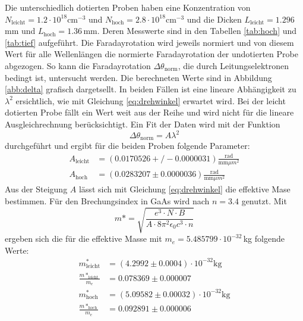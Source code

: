 Die unterschiedlich dotierten Proben haben eine Konzentration von $N_{\text{leicht}}=1.2\cdot10^{18}\text{cm}^{-3}$ und $N_{\text{hoch}}=2.8\cdot10^{18}\text{cm}^{-3}$ und die Dicken $L_{\text{leicht}}=1.296\,$mm und $L_{\text{hoch}}=1.36\,$mm.
Deren Messwerte sind in den Tabellen \ref{tab:hoch} und \ref{tab:tief} aufgeführt.
Die Faradayrotation wird jeweils normiert und von diesem Wert für alle Wellenlängen die normierte Faradayrotation der undotierten Probe abgezogen.
So kann die Faradayrotation $\Delta\theta_\text{norm}$, die durch Leitungselektronen bedingt ist, untersucht werden. 
Die berechneten Werte sind in Abbildung \ref{abb:delta} grafisch dargetsellt.
In beiden Fällen ist eine lineare Abhängigkeit zu $\lambda^2$ ersichtlich, wie mit Gleichung \ref{eq:drehwinkel} erwartet wird.
Bei der leicht dotierten Probe fällt ein Wert weit aus der Reihe und wird nicht für die lineare Ausgleichrechnung berücksichtigt.
Ein Fit der Daten wird mit der Funktion
\begin{equation}
  \Delta\theta_{\text{norm}} = A\lambda^2
\end{equation}
durchgeführt und ergibt für die beiden Proben folgende Parameter:
\begin{align*}
  A_{\text{leicht}} &= (0.0170526 +/- 0.0000031) \frac{\text{rad}}{\text{mm}\mu m^2} \\
  A_{\text{hoch}} &= (0.0283207 \pm 0.0000036) \frac{\text{rad}}{\text{mm}\mu m^2}
\end{align*}
Aus der Steigung $A$ lässt sich mit Gleichung \ref{eq:drehwinkel} die effektive Mase bestimmen.
Für den Brechungsindex in GaAs wird nach \cite{nGaAs} $n=3.4$ genutzt.
Mit
\begin{equation}
  m*=\sqrt{\frac{e^3\cdot N \cdot B}{A\cdot 8\pi^2\epsilon_0 c^3 \cdot n }}
\end{equation}
ergeben sich die für die effektive Masse mit $m_e = 5.485799\cdot 10^{-32}\,$kg folgende Werte:
\begin{align*}
  m^*_{\text{leicht}} &= (4.2992 \pm 0.0004)\cdot 10^{-32}\text{kg} \\
  \frac{m*_{\text{leicht}}}{m_e} &= 0.078369\pm 0.000007 \\
  m^*_{\text{hoch}} &= (5.09582\pm 0.00032)\cdot 10^{-32}\text{kg} \\
  \frac{m*_{\text{hoch}}}{m_e} &= 0.092891\pm 0.000006\\
\end{align*}

